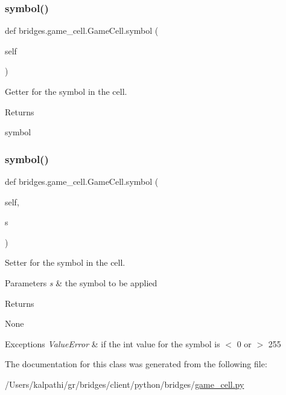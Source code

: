 \subsubsection{\texorpdfstring{symbol()}{symbol()}\hspace{0.1cm}{\footnotesize\ttfamily [1/2]}}
{\footnotesize\ttfamily def bridges.\+game\+\_\+cell.\+Game\+Cell.\+symbol (\begin{DoxyParamCaption}\item[{}]{self }\end{DoxyParamCaption})}



Getter for the symbol in the cell. 

\begin{DoxyReturn}{Returns}


symbol 
\end{DoxyReturn}
\mbox{\label{classbridges_1_1game__cell_1_1_game_cell_a2ce9aa7d7d7835c511338c65a1457e22}} 
\subsubsection{\texorpdfstring{symbol()}{symbol()}\hspace{0.1cm}{\footnotesize\ttfamily [2/2]}}
{\footnotesize\ttfamily def bridges.\+game\+\_\+cell.\+Game\+Cell.\+symbol (\begin{DoxyParamCaption}\item[{}]{self,  }\item[{}]{s }\end{DoxyParamCaption})}



Setter for the symbol in the cell. 


\begin{DoxyParams}{Parameters}
{\em s} & the symbol to be applied \\
\hline
\end{DoxyParams}
\begin{DoxyReturn}{Returns}


None
\end{DoxyReturn}

\begin{DoxyExceptions}{Exceptions}
{\em Value\+Error} & if the int value for the symbol is $<$ 0 or $>$ 255 \\
\hline
\end{DoxyExceptions}


The documentation for this class was generated from the following file\+:\begin{DoxyCompactItemize}
\item 
/\+Users/kalpathi/gr/bridges/client/python/bridges/\mbox{\hyperlink{game__cell_8py}{game\+\_\+cell.\+py}}\end{DoxyCompactItemize}
